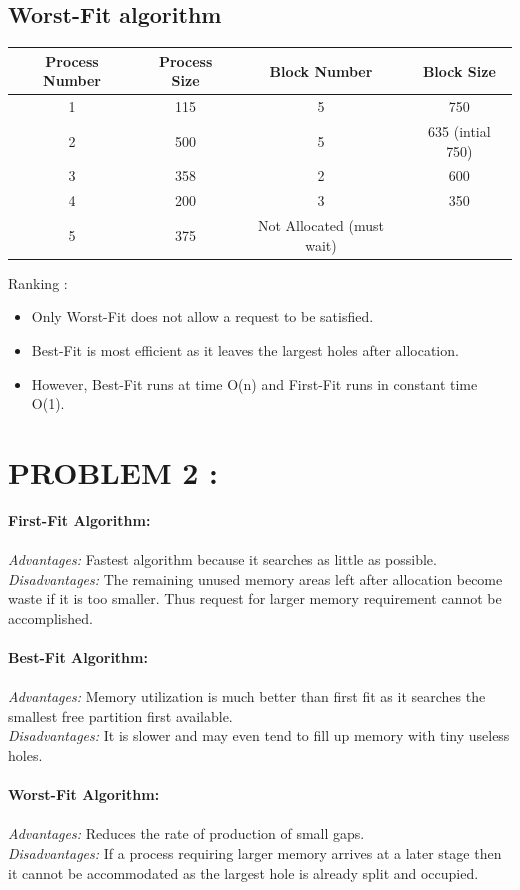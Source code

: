 \documentclass[a4paper]{article}
\begin{document}
\subsection{Worst-Fit algorithm}
\begin{center}
\begin{tabular}{|c|c|c|c|}
\hline
Process Number & Process Size & Block Number & Block Size\\
\hline
1 & 115	& 5 & 750\\
\hline
2 & 500	& 5 & 635 (intial 750)\\
\hline
3 & 358	& 2 & 600\\
\hline
4 & 200	& 3 & 350\\
\hline
5 & 375	& Not Allocated (must wait) &\\
\hline
\end{tabular}
\end{center}
\vspace{0.3cm}
Ranking :
\begin{itemize}
\item Only Worst-Fit does not allow a request to be satisfied.
\item Best-Fit is most efficient as it leaves the largest holes after allocation.
\item However, Best-Fit runs at time O(n) and First-Fit runs in constant time O(1).
\end{itemize}

\section{PROBLEM 2 :}
\textbf{First-Fit Algorithm:} \\
\\
\textit{Advantages:} Fastest algorithm because it searches as little as possible. \\
\textit{Disadvantages:} The remaining unused memory areas left after allocation become waste if it is too smaller. Thus request for larger memory requirement cannot be accomplished. \\
\\
\textbf{Best-Fit Algorithm:} \\
\\
\textit{Advantages:} Memory utilization is much better than first fit as it searches the smallest free partition first available. \\
\textit{Disadvantages:} It is slower and may even tend to fill up memory with tiny useless holes. \\
\\
\textbf{Worst-Fit Algorithm:} \\
\\
\textit{Advantages:} Reduces the rate of production of small gaps. \\
\textit{Disadvantages:} If a process requiring larger memory arrives at a later stage then it cannot be accommodated as the largest hole is already split and occupied. \\
\end{document}
